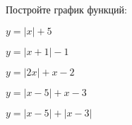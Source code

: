 \begin{ex}
	\begin{condition}
		Постройте график функций:
		\begin{enumcols}[itemcolumns=3]
			\item \( y=|x|+5 \)
			\item \( y=|x+1| - 1 \)
			\item \( y=|2x|+x-2 \)
			\item \( y=|x-5|+x-3 \)
			\item \( y=|x-5|+|x-3| \)
		\end{enumcols}
	\end{condition}
\end{ex}